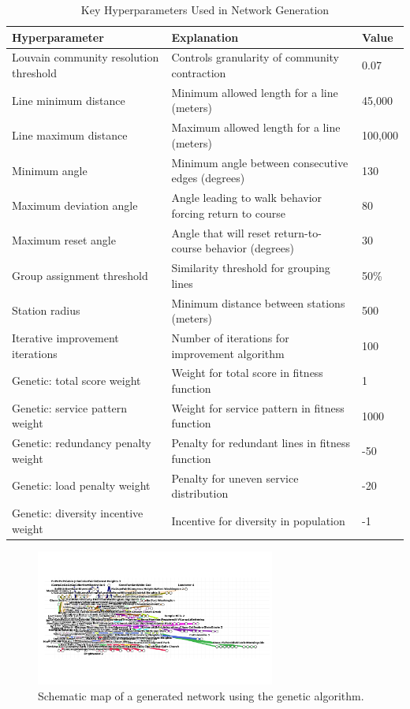 \documentclass[manuscript,nonacm]{acmart}
\begin{document}
\begin{table}[h]
\caption{Key Hyperparameters Used in Network Generation}
\label{tab:hyperparams}
\begin{tabular}{lll}
\toprule
\textbf{Hyperparameter} & \textbf{Explanation} & \textbf{Value} \\
\midrule
Louvain community resolution threshold & Controls granularity of community contraction & 0.07 \\
Line minimum distance & Minimum allowed length for a line (meters) & 45,000 \\
Line maximum distance & Maximum allowed length for a line (meters) & 100,000 \\
Minimum angle & Minimum angle between consecutive edges (degrees) & 130 \\
Maximum deviation angle & Angle leading to walk behavior forcing return to course & 80 \\
Maximum reset angle & Angle that will reset return-to-course behavior (degrees) & 30 \\
Group assignment threshold & Similarity threshold for grouping lines & 50\% \\
Station radius & Minimum distance between stations (meters) & 500 \\
Iterative improvement iterations & Number of iterations for improvement algorithm & 100 \\
Genetic: total score weight & Weight for total score in fitness function & 1 \\
Genetic: service pattern weight & Weight for service pattern in fitness function & 1000 \\
Genetic: redundancy penalty weight & Penalty for redundant lines in fitness function & -50 \\
Genetic: load penalty weight & Penalty for uneven service distribution & -20 \\
Genetic: diversity incentive weight & Incentive for diversity in population & -1 \\
\bottomrule
\end{tabular}
\end{table}

\begin{figure}[h]
    \centering
    \includegraphics[width=0.7\textwidth]{img/lines_genetic.png}
    \caption{Schematic map of a generated network using the genetic algorithm.}
    \label{fig:schematic2}
\end{figure}
\end{document}
